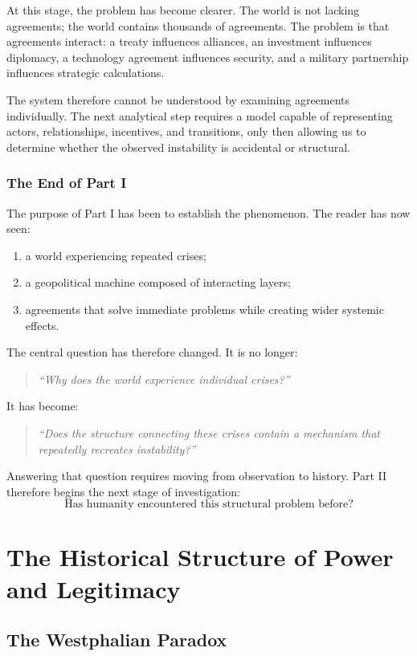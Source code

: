 \documentclass[11pt,openany]{book}
\theoremstyle{plain}
\theoremstyle{definition}
\begin{document}
At this stage, the problem has become clearer. The world is not lacking agreements; the world contains thousands of agreements. The problem is that agreements interact: a treaty influences alliances, an investment influences diplomacy, a technology agreement influences security, and a military partnership influences strategic calculations. 

The system therefore cannot be understood by examining agreements individually. The next analytical step requires a model capable of representing actors, relationships, incentives, and transitions, only then allowing us to determine whether the observed instability is accidental or structural.

\section*{The End of Part I}

The purpose of Part I has been to establish the phenomenon. The reader has now seen:
\begin{enumerate}
\item a world experiencing repeated crises;
\item a geopolitical machine composed of interacting layers;
\item agreements that solve immediate problems while creating wider systemic effects.
\end{enumerate}

The central question has therefore changed. It is no longer:
\begin{quote}
\textit{``Why does the world experience individual crises?''}
\end{quote}
It has become:
\begin{quote}
\textit{``Does the structure connecting these crises contain a mechanism that repeatedly recreates instability?''}
\end{quote}

Answering that question requires moving from observation to history. Part II therefore begins the next stage of investigation:
\[
\boxed{
\text{Has humanity encountered this structural problem before?}
}
\]


\part{The Historical Structure of Power and Legitimacy}


\chapter{The Westphalian Paradox}
\end{document}
